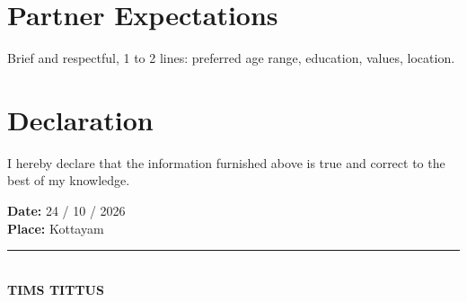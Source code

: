 \documentclass[10.5pt, a4paper]{article}
\newcommand{\cvname}{TIMS TITTUS}
\begin{document}
\section{Partner Expectations}
Brief and respectful, 1 to 2 lines: preferred age range, education, values, location.
\else
\fi

\section{Declaration}
I hereby declare that the information furnished above is true and correct to the best of my knowledge.

\vspace{0.4cm}
\noindent
\begin{minipage}[t]{0.5\textwidth}
  \textbf{Date:} 24 / 10 / 2026\\[4pt]
  \textbf{Place:} Kottayam
\end{minipage}\hfill
\begin{minipage}[t]{0.4\textwidth}
  \raggedleft
  \rule{4.5cm}{0.4pt}\\[2pt]
  \textbf{\cvname}
\end{minipage}
\end{document}
